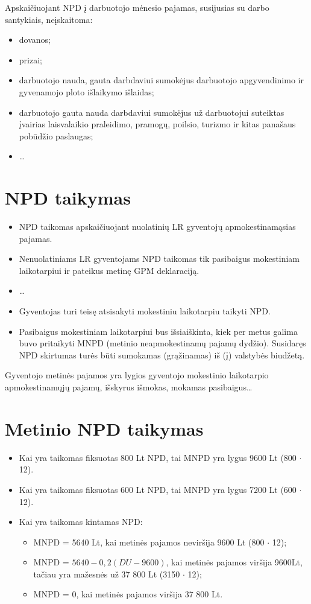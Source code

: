 Apskaičiuojant NPD į darbuotojo mėnesio pajamas, susijusias su darbo
santykiais, neįskaitoma:
\begin{itemize}
  \item dovanos;
  \item prizai;
  \item darbuotojo nauda, gauta darbdaviui sumokėjus darbuotojo
    apgyvendinimo ir gyvenamojo ploto išlaikymo išlaidas;
  \item darbuotojo gauta nauda darbdaviui sumokėjus už darbuotojui
    suteiktas įvairias laisvalaikio praleidimo, pramogų,
    poilsio, turizmo ir kitas panašaus pobūdžio paslaugas;
  \item …
\end{itemize}

\section{NPD taikymas}

\begin{itemize}
  \item NPD taikomas apskaičiuojant nuolatinių LR gyventojų 
    apmokestinamąsias pajamas.
  \item Nenuolatiniams LR gyventojams NPD taikomas tik pasibaigus
    mokestiniam laikotarpiui ir pateikus metinę GPM deklaraciją.
  \item …
  \item Gyventojas turi teisę atsisakyti mokestiniu laikotarpiu
    taikyti NPD.
  \item Pasibaigus mokestiniam laikotarpiui bus išsiaiškinta, kiek
    per metus galima buvo pritaikyti MNPD (metinio neapmokestinamų
    pajamų dydžio). Susidaręs NPD skirtumas turės būti sumokamas
    (grąžinamas) iš (į) valstybės biudžetą.
\end{itemize}

Gyventojo metinės pajamos yra lygios gyventojo mokestinio laikotarpio
apmokestinamųjų pajamų, išskyrus išmokas, mokamas pasibaigus…

\section{Metinio NPD taikymas}

\begin{itemize}
  \item Kai yra taikomas fiksuotas 800 Lt NPD, tai MNPD yra
    lygus 9600 Lt (800 $\cdot$ 12).
  \item Kai yra taikomas fiksuotas 600 Lt NPD, tai MNPD yra
    lygus 7200 Lt (600 $\cdot$ 12).
  \item Kai yra taikomas kintamas NPD:
    \begin{itemize}
      \item MNPD = 5640 Lt, kai metinės pajamos neviršija 9600 Lt
        (800 $\cdot$ 12);
      \item MNPD = $5640 - 0,2(DU - 9600)$, kai metinės pajamos
        viršija 9600Lt, tačiau yra mažesnės už 37 800 Lt
        (3150 $\cdot$ 12);
      \item MNPD = 0, kai metinės pajamos viršija 37 800 Lt.
    \end{itemize}
\end{itemize}

